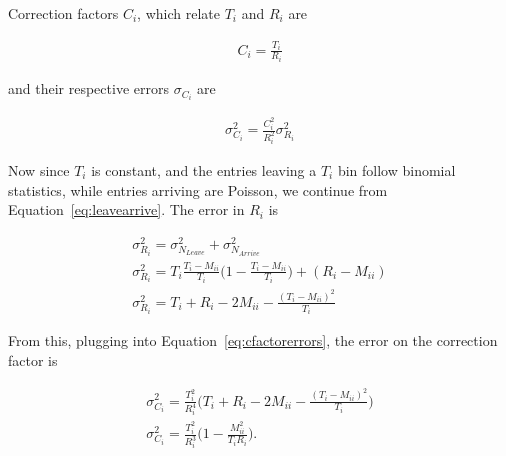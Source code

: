 Correction factors $C_{i}$, which relate $T_{i}$ and $R_{i}$ are

\begin{eqnarray} \label{eq:cfactors}
C_{i} = \frac{T_{i}}{R_{i}}
\end{eqnarray} 

and their respective errors $\sigma_{C_{i}}$ are

\begin{eqnarray} \label{eq:cfactorerrors}
\sigma_{C_{i}}^{2} = \frac{C_{i}^{2}}{R_{i}^{2}}\sigma_{R_{i}}^{2}
\end{eqnarray}	

Now since $T_{i}$ is constant, and the entries leaving a $T_{i}$ bin follow binomial statistics, while entries arriving are Poisson, we continue from Equation~\ref{eq:leavearrive}. The error in $R_{i}$ is 

\begin{eqnarray}
\sigma_{R_{i}}^{2} = \sigma_{N_{Leave}}^{2} + \sigma_{N_{Arrive}}^{2} \\ 
\sigma_{R_{i}}^{2} = T_{i}\frac{T_{i} - M_{ii}}{T_{i}}\big(1 - \frac{T_{i} - M_{ii}}{T_{i}}\big)+(R_{i}-M_{ii}) \\
\sigma_{R_{i}}^{2} = T_{i} + R_{i} - 2M_{ii} - \frac{(T_{i} - M_{ii})^{2}}{T_{i}}
\end{eqnarray}	

From this, plugging into Equation~\ref{eq:cfactorerrors}, the error on the correction factor is

\begin{eqnarray} \label{eq:cfactorerror}
\sigma_{C_{i}}^{2} = \frac{T_{i}^{2}}{R_{i}^{4}}\Big(T_{i} + R_{i} -2M_{ii} - \frac{(T_{i} - M_{ii})^{2}}{T_{i}}\Big) \\
\sigma_{C_{i}}^{2} = \frac{T_{i}^{2}}{R_{i}^{3}}\Big(1 - \frac{M_{ii}^{2}}{T_{i}R_{i}}\Big).
\end{eqnarray}	

